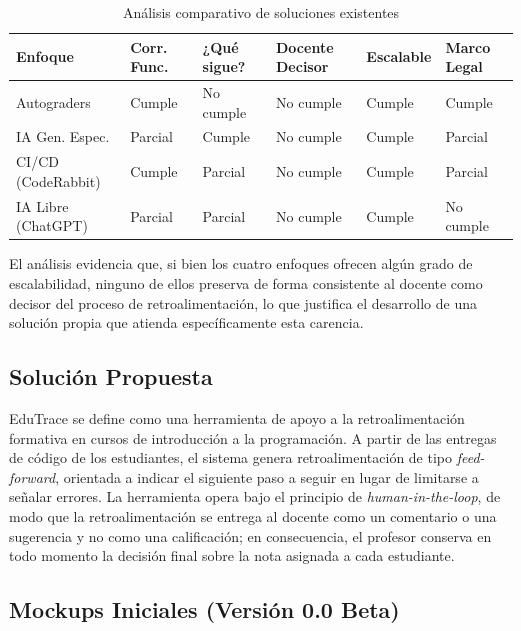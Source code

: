 \documentclass[letterpaper, 10 pt, conference]{ieeeconf}
\begin{document}
\begin{table}[ht]
	\centering
	\caption{Análisis comparativo de soluciones existentes}
	\label{tab:comparativo}
	\footnotesize %
	\setlength{\tabcolsep}{2pt} %
	\begin{tabular}{lp{0.9cm}p{0.9cm}p{1.1cm}p{1.15cm}p{0.9cm}}
		\hline
		\textbf{Enfoque} & \textbf{Corr. Func.} & \textbf{¿Qué sigue?} & \textbf{Docente Decisor} & \textbf{Escalable} & \textbf{Marco Legal} \\
		\hline
		Autograders & Cumple & No cumple & No cumple & Cumple & Cumple \\
		IA Gen. Espec. & Parcial & Cumple & No cumple & Cumple & Parcial \\
		CI/CD (CodeRabbit) & Cumple & Parcial & No cumple & Cumple & Parcial \\
		IA Libre (ChatGPT) & Parcial & Parcial & No cumple & Cumple & No cumple \\
		\hline
	\end{tabular}
\end{table}

El análisis evidencia que, si bien los cuatro enfoques ofrecen algún grado de escalabilidad, ninguno de ellos preserva de forma consistente al docente como decisor del proceso de retroalimentación, lo que justifica el desarrollo de una solución propia que atienda específicamente esta carencia.

\subsection{Solución Propuesta}
EduTrace se define como una herramienta de apoyo a la retroalimentación formativa en cursos de introducción a la programación. A partir de las entregas de código de los estudiantes, el sistema genera retroalimentación de tipo \textit{feed-forward}, orientada a indicar el siguiente paso a seguir en lugar de limitarse a señalar errores. La herramienta opera bajo el principio de \textit{human-in-the-loop}, de modo que la retroalimentación se entrega al docente como un comentario o una sugerencia y no como una calificación; en consecuencia, el profesor conserva en todo momento la decisión final sobre la nota asignada a cada estudiante.

\subsection{Mockups Iniciales (Versión 0.0 Beta)}
\end{document}
